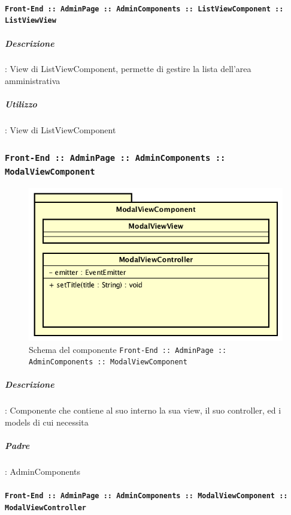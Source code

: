 \documentclass[../DefinizioneDiProdotto_v3.0.0.tex]{subfiles}
\begin{document}
			      \paragraph{\texttt{Front-End :: AdminPage :: AdminComponents :: ListViewComponent :: ListViewView}}
			      	\subparagraph{Descrizione}: View di ListViewComponent, permette di gestire la lista dell'area amministrativa
			      	\subparagraph{Utilizzo}: View di ListViewComponent
\newpage
	\subsubsection{\texttt{Front-End :: AdminPage :: AdminComponents :: ModalViewComponent}}
	\begin{figure}[!h]
		\centering
		\includegraphics[scale=0.7]{Architettura/Front-End/AdminPage/AdminComponents/ModalViewComponent.png}
		\caption{Schema del componente \texttt{Front-End :: AdminPage :: AdminComponents :: ModalViewComponent}}
	\end{figure}

			\subparagraph{Descrizione}: Componente che contiene al suo interno la sua view, il suo controller, ed i models di cui necessita
			\subparagraph{Padre}: AdminComponents
				\paragraph{\texttt{Front-End :: AdminPage :: AdminComponents :: ModalViewComponent :: ModalViewController}}
\end{document}
